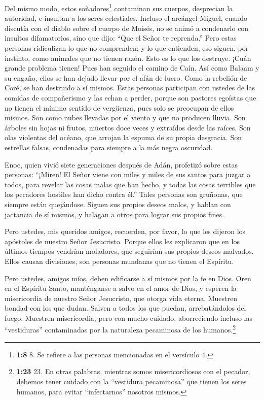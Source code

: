  Del mismo modo, estos soñadores\footnote{\textbf{1:8} 8. Se
  refiere a las personas mencionadas en el versículo 4.} contaminan sus
cuerpos, desprecian la autoridad, e insultan a los seres celestiales.
 Incluso el arcángel Miguel, cuando discutía con el diablo
sobre el cuerpo de Moisés, no se animó a condenarlo con insultos
difamatorios, sino que dijo: ``Que el Señor te reprenda.'' 
Pero estas personas ridiculizan lo que no comprenden; y lo que
entienden, eso siguen, por instinto, como animales que no tienen razón.
Esto es lo que los destruye.  ¡Cuán grande problema tienen!
Pues han seguido el camino de Caín. Así como Balaam y su engaño, ellos
se han dejado llevar por el afán de lucro. Como la rebelión de Coré, se
han destruido a sí mismos.  Estas personas participan con
ustedes de las comidas de compañerismo y las echan a perder, porque son
pastores egoístas que no tienen el mínimo sentido de vergüenza, pues
solo se preocupan de ellos mismos. Son como nubes llevadas por el viento
y que no producen lluvia. Son árboles sin hojas ni frutos, muertos doce
veces y extraídos desde las raíces.  Son olas violentas del
océano, que arrojan la espuma de su propia desgracia. Son estrellas
falsas, condenadas para siempre a la más negra oscuridad.

 Enoc, quien vivió siete generaciones después de Adán,
profetizó sobre estas personas: ``¡Miren! El Señor viene con miles y
miles de sus santos  para juzgar a todos, para revelar las
cosas malas que han hecho, y todas las cosas terribles que los pecadores
hostiles han dicho contra él.''  Tales personas son
gruñonas, que siempre están quejándose. Siguen sus propios deseos malos,
y hablan con jactancia de sí mismos, y halagan a otros para lograr sus
propios fines.

 Pero ustedes, mis queridos amigos, recuerden, por favor,
lo que les dijeron los apóstoles de nuestro Señor Jesucristo.
 Porque ellos les explicaron que en los últimos tiempos
vendrían mofadores, que seguirían sus propios deseos malvados.
 Ellos causan divisiones, son personas mundanas que no
tienen el Espíritu.

 Pero ustedes, amigos míos, deben edificarse a sí mismos
por la fe en Dios. Oren en el Espíritu Santo,  manténganse
a salvo en el amor de Dios, y esperen la misericordia de nuestro Señor
Jesucristo, que otorga vida eterna.  Muestren bondad con
los que dudan.  Salven a todos los que puedan,
arrebatándolos del fuego. Muestren misericordia, pero con mucho cuidado,
aborreciendo incluso las ``vestiduras'' contaminadas por la naturaleza
pecaminosa de los humanos.\footnote{\textbf{1:23} 23. En otras palabras,
  mientras somos misericordiosos con el pecador, debemos tener cuidado
  con la ``vestidura pecaminosa'' que tienen los seres humanos, para
  evitar ``infectarnos'' nosotros mismos.}

